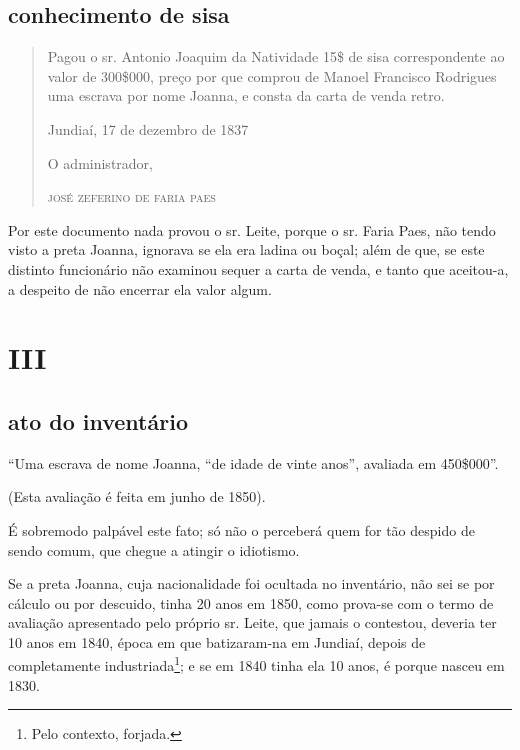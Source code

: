 \subsection{conhecimento de sisa\protect\footnotemark}


\begin{quote}
Pagou o sr. Antonio Joaquim da Natividade 15\$ de sisa correspondente
ao valor de 300\$000, preço por que comprou de Manoel Francisco
Rodrigues uma escrava por nome Joanna, e consta da carta de venda
retro.

\begin{flushright}
Jundiaí, 17 de dezembro de 1837

O administrador,

\textsc{josé zeferino de faria paes}
\end{flushright}
\end{quote}

Por este documento nada provou o sr. Leite, porque o sr. Faria Paes, não
tendo visto a preta Joanna, ignorava se ela era ladina ou boçal; além de
que, se este distinto funcionário não examinou sequer a carta de venda,
e tanto que aceitou-a, a despeito de não encerrar ela valor algum.

\section{III}

\subsection{ato do inventário}

``Uma escrava de nome Joanna, ``de idade de vinte anos'', avaliada em
450\$000''.

(Esta avaliação é feita em junho de 1850).

É sobremodo palpável este fato; só não o perceberá quem for tão despido
de sendo comum, que chegue a atingir o idiotismo.

Se a preta Joanna, cuja nacionalidade foi ocultada no inventário, não
sei se por cálculo ou por descuido, tinha 20 anos em 1850, como prova-se
com o termo de avaliação apresentado pelo próprio sr. Leite, que jamais
o contestou, deveria ter 10 anos em 1840, época em que batizaram-na em
Jundiaí, depois de completamente industriada\footnote{ Pelo contexto,
  forjada.}; e se em 1840 tinha ela 10 anos, é porque nasceu em 1830.

